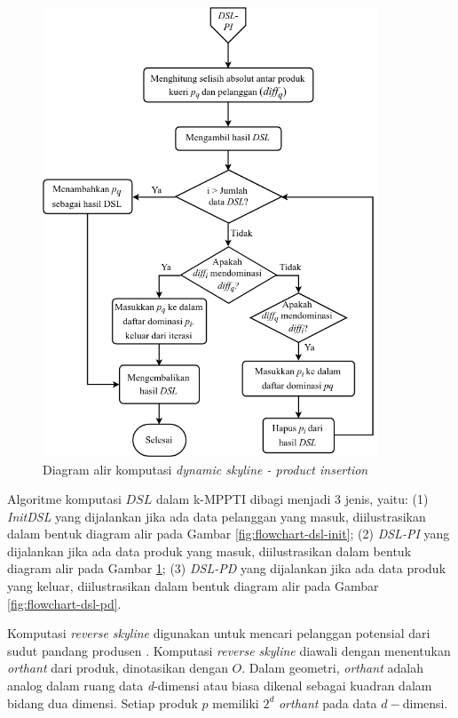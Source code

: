 \begin{figure}[H]
	\centering
	\includegraphics[width=10cm]{assets/img/bab3/flowchart-dsl-pi.png}
	\caption{Diagram alir komputasi \textit{dynamic skyline - product  insertion}}
	\label{fig:flowchart-dsl-pi}
\end{figure}

\pagebreak
Algoritme komputasi $DSL$ dalam k-MPPTI dibagi menjadi 3 jenis, yaitu: (1) \textit{InitDSL} yang dijalankan jika ada data pelanggan yang masuk, diilustrasikan dalam bentuk diagram alir pada Gambar \ref{fig:flowchart-dsl-init}; (2) \textit{DSL-PI} yang dijalankan jika ada data produk yang masuk, diilustrasikan dalam bentuk diagram alir pada Gambar \ref{fig:flowchart-dsl-pi}; (3) \textit{DSL-PD} yang dijalankan jika ada data produk yang keluar, diilustrasikan dalam bentuk diagram alir pada Gambar \ref{fig:flowchart-dsl-pd}.


Komputasi \textit{reverse skyline} digunakan untuk mencari pelanggan potensial dari sudut pandang produsen \cite{kmpp}. Komputasi \textit{reverse skyline} diawali dengan menentukan \textit{orthant} dari produk, dinotasikan dengan $O$. Dalam geometri, \textit{orthant} adalah analog dalam ruang data \textit{d}-dimensi atau biasa dikenal sebagai kuadran dalam bidang dua dimensi. Setiap produk $p$ memiliki $2^d$ \textit{orthant} pada data $d-$dimensi. 

